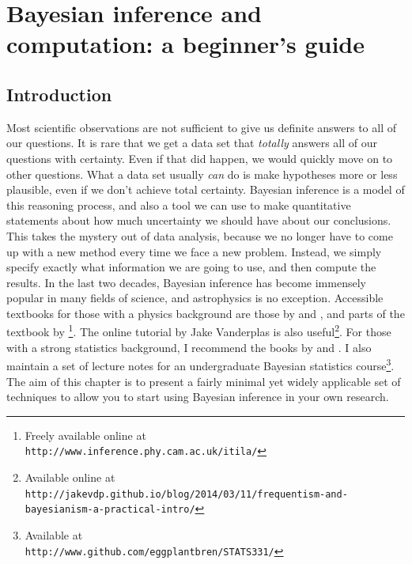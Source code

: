 \newcommand{\btheta}{\boldsymbol{\theta}}
\newcommand{\data}{\boldsymbol{D}}
\newcommand{\documentname}{chapter}

\author[Brendon J. Brewer]{Brendon J. Brewer\\
Department of Statistics, The University of Auckland}

\chapter{Bayesian inference and computation: a beginner's guide}

\section{Introduction}
Most scientific observations are not sufficient to give us definite answers
to all of our questions. It is rare that we get a data set that {\it totally}
answers all of our questions with certainty. Even if that did happen, we would
quickly move on to other questions.
What a data set usually {\it can} do is make hypotheses more or less plausible,
even if we don't achieve total certainty.
Bayesian inference is a model of this
reasoning process, and also a tool we can use
to make quantitative statements about how much
uncertainty we should have about our conclusions. This takes the mystery out
of data analysis, because we no longer have to come up with a new method
every time we face a new problem. Instead, we simply specify exactly what
information we are going to use, and then compute the results.
In the last two decades, Bayesian inference has become immensely popular in
many fields of science, and astrophysics is no exception. Accessible textbooks
for those with a physics background are those by \citet{gregory} and
\citet{sivia}, and parts of the textbook by \citet{mackay}\footnote{Freely
available online at\\
{\tt http://www.inference.phy.cam.ac.uk/itila/}}.
The online tutorial
by Jake Vanderplas is also useful\footnote{Available online at\\
{\tt http://jakevdp.github.io/blog/2014/03/11/frequentism-and-bayesianism-a-practical-intro/}}. For those with a strong statistics background,
I recommend the books by \citet{ohagan} and \citet{gelman}. I also maintain
a set of lecture notes for an undergraduate Bayesian statistics
course\footnote{Available at\\
{\tt http://www.github.com/eggplantbren/STATS331/}}.
The aim of this chapter is to present a fairly minimal yet widely applicable set of techniques to
allow you to start using Bayesian inference in your own research.

